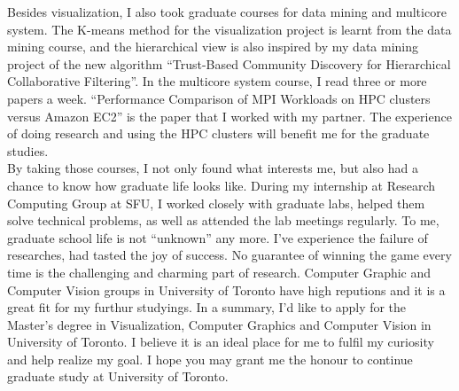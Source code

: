 \documentclass{article}
\begin{document}
Besides visualization, I also took graduate courses for data mining and multicore system. The K-means method for the visualization project is learnt from the data mining course, and the hierarchical view is also inspired by my data mining project of the new algorithm ``Trust-Based Community Discovery for Hierarchical Collaborative Filtering''. In the multicore system course, I read three or more papers a week. ``Performance Comparison of MPI Workloads on HPC clusters versus Amazon EC2'' is the paper that I worked with my partner. The experience of doing research and using the HPC clusters will benefit me for the graduate studies.  \\


By taking those courses, I not only found what interests me, but also had a chance to know how graduate life looks like. During my internship at Research Computing Group at SFU, I worked closely with graduate labs, helped them solve technical problems, as well as attended the lab meetings regularly. To me, graduate school life is not ``unknown'' any more. I've experience the failure of researches, had tasted the joy of success. No guarantee of winning the game every time is the challenging and charming part of research. Computer Graphic and Computer Vision groups in University of Toronto have high reputions and it is a great fit for my furthur studyings. In a summary, I'd like to apply for the Master's degree in Visualization, Computer Graphics and Computer Vision in University of Toronto. I believe it is an ideal place for me to fulfil my curiosity and help realize my goal. I hope you may grant me the honour to continue graduate study at University of Toronto.  \\
\end{document}
